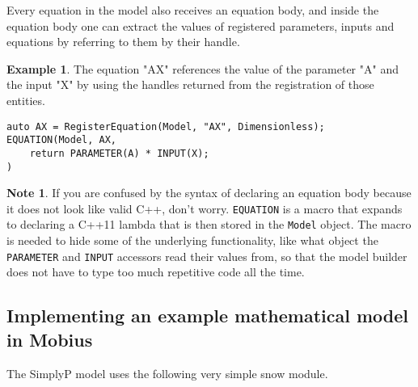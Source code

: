 \documentclass[11pt]{article}
\theoremstyle{definition}
\newtheorem{mynote}{Note}
\newenvironment{note}%
  {\begin{lrbox}{\notebox}%
   \begin{minipage}{\dimexpr\linewidth-2\fboxsep}
   \begin{mynote}}%
  {\end{mynote}%
   \end{minipage}%
   \end{lrbox}%
   \begin{trivlist}
     \item[]\colorbox{silver}{\usebox\notebox}
   \end{trivlist}}
\newtheorem{myexample}{Example}
\newenvironment{example}%
  {\begin{lrbox}{\examplebox}%
   \begin{minipage}{\dimexpr\linewidth-2\fboxsep}
   \begin{myexample}}%
  {\end{myexample}%
   \end{minipage}%
   \end{lrbox}%
   \begin{trivlist}
     \item[]\colorbox{silver}{\usebox\examplebox}
   \end{trivlist}}
\begin{document}
Every equation in the model also receives an equation body, and inside the equation body one can extract the values of registered parameters, inputs and equations by referring to them by their handle.

\begin{example}\label{ex:equation}
The equation "AX" references the value of the parameter "A" and the input "X" by using the handles returned from the registration of those entities.
\begin{lstlisting}[style=mycpp]
auto AX = RegisterEquation(Model, "AX", Dimensionless);
EQUATION(Model, AX,
	return PARAMETER(A) * INPUT(X);
)
\end{lstlisting}
\end{example}

\begin{note}
If you are confused by the syntax of declaring an equation body because it does not look like valid C++, don't worry. {\tt EQUATION} is a macro that expands to declaring a C++11 lambda that is then stored in the {\tt Model} object. The macro is needed to hide some of the underlying functionality, like what object the {\tt PARAMETER} and {\tt INPUT} accessors read their values from, so that the model builder does not have to type too much repetitive code all the time.
\end{note}

\subsection{Implementing an example mathematical model in Mobius}

The SimplyP model \cite{jackson-blake17} uses the following very simple snow module.
\end{document}
